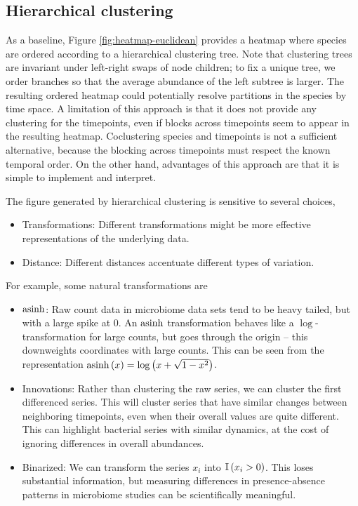 \subsection{Hierarchical clustering}

As a baseline, Figure \ref{fig:heatmap-euclidean} provides a heatmap where
species are ordered according to a hierarchical clustering tree. Note that
clustering trees are invariant under left-right swaps of node children; to fix a
unique tree, we order branches so that the average abundance of the left subtree
is larger. The resulting ordered heatmap could potentially resolve partitions in
the species by time space. A limitation of this approach is that it does not
provide any clustering for the timepoints, even if blocks across timepoints seem
to appear in the resulting heatmap. Coclustering species and timepoints is not a
sufficient alternative, because the blocking across timepoints must respect the
known temporal order. On the other hand, advantages of this approach are that it
is simple to implement and interpret.

The figure generated by hierarchical clustering is sensitive to several choices,
\begin{itemize}
\item Transformations: Different transformations might be more effective
  representations of the underlying data.
\item Distance: Different distances accentuate different types of variation.
\end{itemize}

For example, some natural transformations are
\begin{itemize}
\item $\mathop\mathrm{asinh}$: Raw count data in microbiome data sets tend to
  be heavy tailed, but with a large spike at 0. An $\mathop\mathrm{asinh}$ transformation
  behaves like a $\log$-transformation for large counts, but goes through the
  origin -- this downweights coordinates with large counts. This can be seen
  from the representation $\mathop\mathrm{asinh}\left(x\right) = \log\left(x + \sqrt{1 -
      x^{2}}\right)$.
\item Innovations: Rather than clustering the raw series, we can cluster the
  first differenced series. This will cluster series that have similar changes between
  neighboring timepoints, even when their overall values are quite different. This
  can highlight bacterial series with similar dynamics, at the cost of ignoring
  differences in overall abundances.
\item Binarized: We can transform the series $x_{i}$ into $\mathbb{I}\left({x_{i} > 0}\right)$.
  This loses substantial information, but measuring differences in
  presence-absence patterns in microbiome studies can be scientifically
  meaningful.
\end{itemize}

